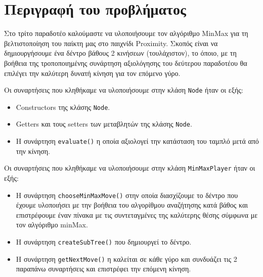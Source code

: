 \chapter{Περιγραφή του προβλήματος}
Στο τρίτο παραδοτέο καλούμαστε να υλοποιήσουμε τον αλγόριθμο MinMax\cite{minmax} για τη βελτιστοποίηση του παίκτη μας στο παιχνίδι Proximity\cite{proximitygame}.
Σκοπός είναι να δημιουργήσουμε ένα δέντρο βάθους 2 κινήσεων (τουλάχιστον), το όποιο,
με τη βοήθεια της τροποποιημένης συνάρτηση αξιολόγησης του δεύτερου παραδοτέου θα επιλέγει την καλύτερη δυνατή κίνηση για τον επόμενο γύρο.

Οι συναρτήσεις  που κληθήκαμε να υλοποιήσουμε στην κλάση \lstinline!Node! ήταν οι εξής:
\begin{itemize}
\item Constructors της κλάσης \lstinline!Node!.

\item Getters και τους setters των μεταβλητών της κλάσης \lstinline!Node!.

\item Η συνάρτηση \lstinline!evaluate()! η οποία αξιολογεί την κατάσταση του ταμπλό μετά από την κίνηση.
\end{itemize}

Οι συναρτήσεις  που κληθήκαμε να υλοποιήσουμε στην κλάση \lstinline!MinMaxPlayer! ήταν οι εξής:
\begin{itemize}
\item Η συνάρτηση \lstinline!chooseMinMaxMove()! στην οποία διασχίζουμε το δέντρο που έχουμε υλοποιήσει με
την βοήθεια του αλγορίθμου αναζήτησης κατά βάθος και επιστρέφουμε έναν πίνακα με τις
συντεταγμένες της καλύτερης θέσης σύμφωνα με τον αλγόριθμο minMax.

\item Η συνάρτηση \lstinline!createSubTree()! που δημιουργεί το δέντρο.

\item Η συνάρτηση \lstinline!getNextMove()! η καλείται σε κάθε γύρο και συνδυάζει τις 2 παραπάνω συναρτήσεις και επιστρέφει την επόμενη κίνηση.
\end{itemize}
